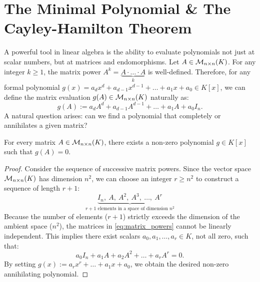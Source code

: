 \setcounter{section}{3} %

\renewcommand{\thetheorem}{21.d.\arabic{theorem}}
\setcounter{theorem}{0}
\section{The Minimal Polynomial \& The Cayley-Hamilton Theorem}

A powerful tool in linear algebra is the ability to evaluate polynomials not just at scalar numbers, but at matrices and endomorphisms. Let $A \in \mathcal{M}_{n \times n}(K)$. For any integer $k \ge 1$, the matrix power $A^k = \underbrace{A \cdot \dots \cdot A}_{k}$ is well-defined. Therefore, for any formal polynomial $g(x) = a_d x^d + a_{d-1}x^{d-1} + \dots + a_1 x + a_0 \in K[x]$, we can define the matrix evaluation $g(A) \in \mathcal{M}_{n \times n}(K)$ naturally as:
\[
g(A) := a_d A^d + a_{d-1}A^{d-1} + \dots + a_1 A + a_0 I_n.
\]
A natural question arises: can we find a polynomial that completely  or annihilates a given matrix?

\begin{claim*}\label{claim:existence_annihilating}
  For every matrix $A \in \mathcal{M}_{n \times n}(K)$, there exists a non-zero polynomial $g \in K[x]$ such that $g(A) = 0$.
\end{claim*}

\begin{proof}
  Consider the sequence of successive matrix powers. Since the vector space $\mathcal{M}_{n \times n}(K)$ has dimension $n^2$, we can choose an integer $r \ge n^2$ to construct a sequence of length $r+1$:
  \begin{equation} \label{eq:matrix_powers}
    \underbrace{I_n, \ A, \ A^2, \ A^3, \ \dots, \ A^r}_{r+1 \text{ elements in a space of dimension } n^2}
  \end{equation}
  Because the number of elements ($r+1$) strictly exceeds the dimension of the ambient space ($n^2$), the matrices in \eqref{eq:matrix_powers} cannot be linearly independent. This implies there exist scalars $a_0, a_1, \dots, a_r \in K$, not all zero, such that:
  \[
  a_0 I_n + a_1 A + a_2 A^2 + \dots + a_r A^r = 0.
  \]
  By setting $g(x) := a_r x^r + \dots + a_1 x + a_0$, we obtain the desired non-zero annihilating polynomial.
\end{proof}

